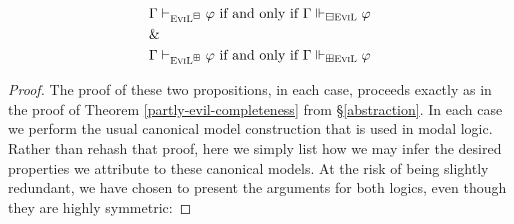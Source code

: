 \begin{theorem}\label{BMBPbadcompleteness}
\begin{eqnarray*}
& \Gamma \vdash_{\textsc{EviL}^\boxminus} \varphi\textup{ if and only if }\Gamma
\Vdash_{\boxminus\textup{\textsc{EviL}}} \varphi \\
& \& \\
& \Gamma \vdash_{\textsc{EviL}^\boxplus} \varphi\textup{ if and only if }\Gamma
\Vdash_{\boxplus\textup{\textsc{EviL}}} \varphi 
\end{eqnarray*}
\end{theorem}
\begin{proof}
  The proof of these two propositions, in each case, proceeds exactly as in the proof of Theorem
  \ref{partly-evil-completeness} from \S\ref{abstraction}. In each
  case we perform the usual canonical model construction that is used
  in modal logic.  
  Rather than rehash that proof, here
  we simply list how we may infer the desired properties we attribute
  to these canonical models.  At the risk of being slightly redundant, we have chosen to
  present the arguments for both logics, even though they are highly symmetric:


\end{proof}
